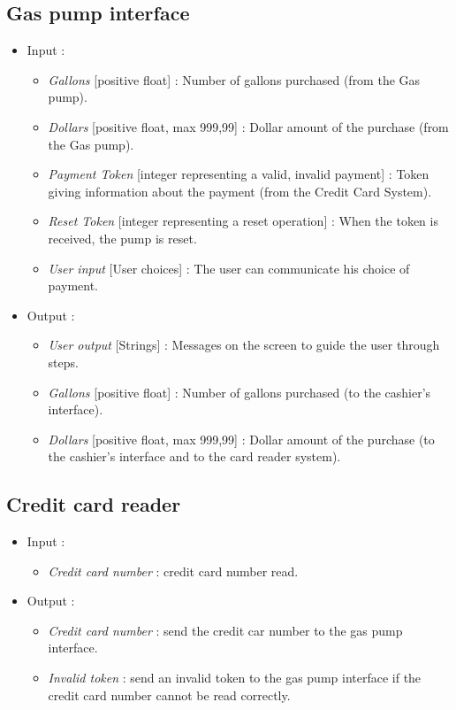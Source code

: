 \documentclass[11pt, a4paper]{article}
\newcommand{\data}[1]{\textit{#1}}
\begin{document}
\bigskip

\subsection{Gas pump interface}

\begin{itemize}
\item Input :
		\begin{itemize}
    \item \data{Gallons} [positive float] : Number of gallons purchased (from the Gas pump).
    \item \data{Dollars} [positive float, max 999,99] : Dollar amount of the purchase (from the Gas pump).
    \item \data{Payment Token} [integer representing a {valid, invalid} payment] : Token giving information about the payment (from the Credit Card System).
    \item \data{Reset Token} [integer representing a reset operation] : When the token is received, the pump is reset.
    \item \data{User input} [User choices] : The user can communicate his choice of payment.
    \end{itemize}

\item Output :
		\begin{itemize}
		\item \data{User output} [Strings] : Messages on the screen to guide the user through steps.
    \item \data{Gallons} [positive float] : Number of gallons purchased (to the cashier's interface).
    \item \data{Dollars} [positive float, max 999,99] : Dollar amount of the purchase (to the cashier's interface and to the card reader system).
		\end{itemize}
\end{itemize}



\newpage
\subsection{Credit card reader}

\begin{itemize}
\item Input :
		\begin{itemize}
		\item \data{Credit card number} : credit card number read.
		\end{itemize}

\item Output :
		\begin{itemize}
		\item \data{Credit card number} : send the credit car number to the gas pump interface.
		\item \data{Invalid token} : send an invalid token to the gas pump interface if the credit card number cannot be read correctly.
		\end{itemize}
\end{itemize}
\end{document}
